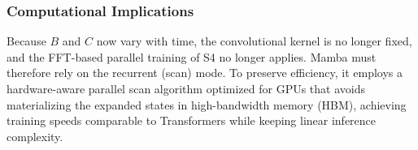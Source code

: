 \subsubsection{Computational Implications}
Because $B$ and $C$ now vary with time, the convolutional kernel is no longer fixed, and the FFT-based parallel training of S4 no longer applies. Mamba must therefore rely on the recurrent (scan) mode. To preserve efficiency, it employs a hardware-aware parallel scan algorithm optimized for GPUs that avoids materializing the expanded states in high-bandwidth memory (HBM), achieving training speeds comparable to Transformers while keeping linear inference complexity.